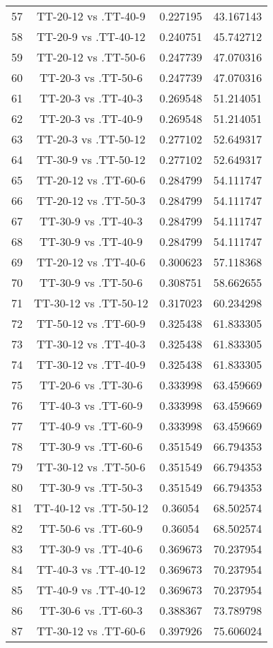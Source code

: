 \documentclass[a4paper,10pt]{article}
\begin{document}
\begin{landscape}
\begin{table}[!htp]
\begin{tabular}{cccc}
57&TT-20-12 vs .TT-40-9&0.227195&43.167143\\
58&TT-20-9 vs .TT-40-12&0.240751&45.742712\\
59&TT-20-12 vs .TT-50-6&0.247739&47.070316\\
60&TT-20-3 vs .TT-50-6&0.247739&47.070316\\
61&TT-20-3 vs .TT-40-3&0.269548&51.214051\\
62&TT-20-3 vs .TT-40-9&0.269548&51.214051\\
63&TT-20-3 vs .TT-50-12&0.277102&52.649317\\
64&TT-30-9 vs .TT-50-12&0.277102&52.649317\\
65&TT-20-12 vs .TT-60-6&0.284799&54.111747\\
66&TT-20-12 vs .TT-50-3&0.284799&54.111747\\
67&TT-30-9 vs .TT-40-3&0.284799&54.111747\\
68&TT-30-9 vs .TT-40-9&0.284799&54.111747\\
69&TT-20-12 vs .TT-40-6&0.300623&57.118368\\
70&TT-30-9 vs .TT-50-6&0.308751&58.662655\\
71&TT-30-12 vs .TT-50-12&0.317023&60.234298\\
72&TT-50-12 vs .TT-60-9&0.325438&61.833305\\
73&TT-30-12 vs .TT-40-3&0.325438&61.833305\\
74&TT-30-12 vs .TT-40-9&0.325438&61.833305\\
75&TT-20-6 vs .TT-30-6&0.333998&63.459669\\
76&TT-40-3 vs .TT-60-9&0.333998&63.459669\\
77&TT-40-9 vs .TT-60-9&0.333998&63.459669\\
78&TT-30-9 vs .TT-60-6&0.351549&66.794353\\
79&TT-30-12 vs .TT-50-6&0.351549&66.794353\\
80&TT-30-9 vs .TT-50-3&0.351549&66.794353\\
81&TT-40-12 vs .TT-50-12&0.36054&68.502574\\
82&TT-50-6 vs .TT-60-9&0.36054&68.502574\\
83&TT-30-9 vs .TT-40-6&0.369673&70.237954\\
84&TT-40-3 vs .TT-40-12&0.369673&70.237954\\
85&TT-40-9 vs .TT-40-12&0.369673&70.237954\\
86&TT-30-6 vs .TT-60-3&0.388367&73.789798\\
87&TT-30-12 vs .TT-60-6&0.397926&75.606024\\

\end{tabular}
\end{table}
\end{landscape}
\end{document}
